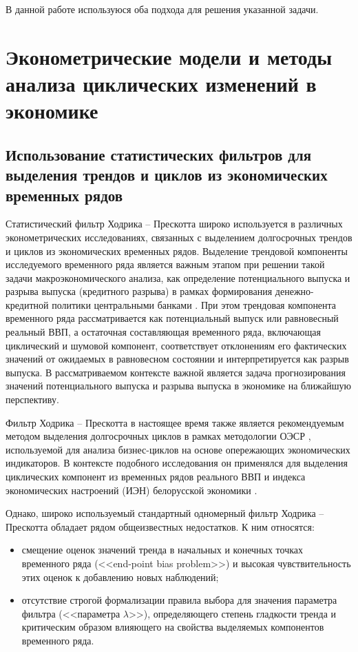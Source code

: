 \documentclass[a4paper,14pt]{extreport}
\begin{document}
	В данной работе используюся оба подхода для решения указанной задачи.
	
	
	
	\chapter{Эконометрические модели и методы анализа циклических изменений в экономике}
	
	
	\section{Использование статистических фильтров для выделения трендов и циклов из экономических временных рядов}
	
	Статистический фильтр Ходрика – Прескотта \cite{hp_orig_paper} широко используется в различных эконометрических исследованиях, связанных с выделением долгосрочных трендов и циклов из экономических временных рядов. Выделение трендовой компоненты исследуемого временного ряда является важным этапом при решении такой задачи макроэкономического анализа, как определение потенциального выпуска и разрыва выпуска (кредитного разрыва) в рамках формирования денежно-кредитной политики центральными банками \cite{zubarev_gap, demidenko_gap, schuler_detrend}. При этом трендовая компонента временного ряда рассматривается как потенциальный выпуск или равновесный реальный ВВП, а остаточная составляющая временного ряда, включающая циклический и шумовой компонент,  соответствует отклонениям его фактических значений  от ожидаемых в равновесном состоянии и интерпретируется как разрыв выпуска. В рассматриваемом контексте важной является задача прогнозирования значений потенциального выпуска и разрыва выпуска в экономике на ближайшую перспективу. 
	
	Фильтр Ходрика – Прескотта в настоящее время также является рекомендуемым методом выделения долгосрочных циклов в рамках методологии ОЭСР \cite{oecdCLI, oecdCycleExtraction}, используемой для анализа бизнес-циклов на основе опережающих экономических индикаторов. В контексте подобного исследования он применялся для выделения циклических компонент из временных рядов реального ВВП и индекса экономических настроений (ИЭН) белорусской экономики \cite{esiMakingAlt}. 
	
	Однако, широко используемый стандартный одномерный фильтр Ходрика – Прескотта обладает рядом общеизвестных недостатков.  К ним относятся: 
	
	\begin{itemize}
		\item смещение оценок значений тренда в начальных и конечных точках временного ряда (<<end-point bias problem>>) и высокая чувствительность этих оценок к добавлению новых наблюдений; 
		\item отсутствие строгой формализации правила выбора для значения параметра фильтра (<<параметра $\lambda$>>), определяющего степень гладкости тренда и критическим образом влияющего на свойства выделяемых компонентов временного ряда.
	\end{itemize}
	
\end{document}
